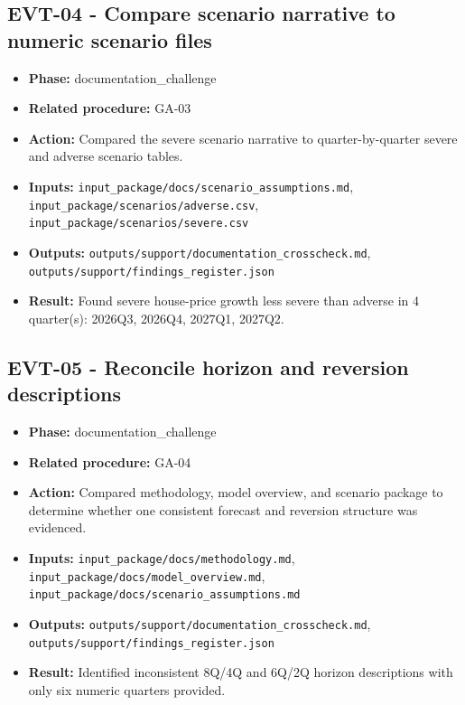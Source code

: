 \documentclass[11pt]{article}
\begin{document}
\subsection*{EVT-04 - Compare scenario narrative to numeric scenario files}
\begin{itemize}
\item \textbf{Phase:} documentation\_challenge
\item \textbf{Related procedure:} GA-03
\item \textbf{Action:} Compared the severe scenario narrative to quarter-by-quarter severe and adverse scenario tables.
\item \textbf{Inputs:} \texttt{input\_package/docs/scenario\_assumptions.md}, \texttt{input\_package/scenarios/adverse.csv}, \texttt{input\_package/scenarios/severe.csv}
\item \textbf{Outputs:} \texttt{outputs/support/documentation\_crosscheck.md}, \texttt{outputs/support/findings\_register.json}
\item \textbf{Result:} Found severe house-price growth less severe than adverse in 4 quarter(s): 2026Q3, 2026Q4, 2027Q1, 2027Q2.
\end{itemize}
\subsection*{EVT-05 - Reconcile horizon and reversion descriptions}
\begin{itemize}
\item \textbf{Phase:} documentation\_challenge
\item \textbf{Related procedure:} GA-04
\item \textbf{Action:} Compared methodology, model overview, and scenario package to determine whether one consistent forecast and reversion structure was evidenced.
\item \textbf{Inputs:} \texttt{input\_package/docs/methodology.md}, \texttt{input\_package/docs/model\_overview.md}, \texttt{input\_package/docs/scenario\_assumptions.md}
\item \textbf{Outputs:} \texttt{outputs/support/documentation\_crosscheck.md}, \texttt{outputs/support/findings\_register.json}
\item \textbf{Result:} Identified inconsistent 8Q/4Q and 6Q/2Q horizon descriptions with only six numeric quarters provided.
\end{itemize}
\end{document}
